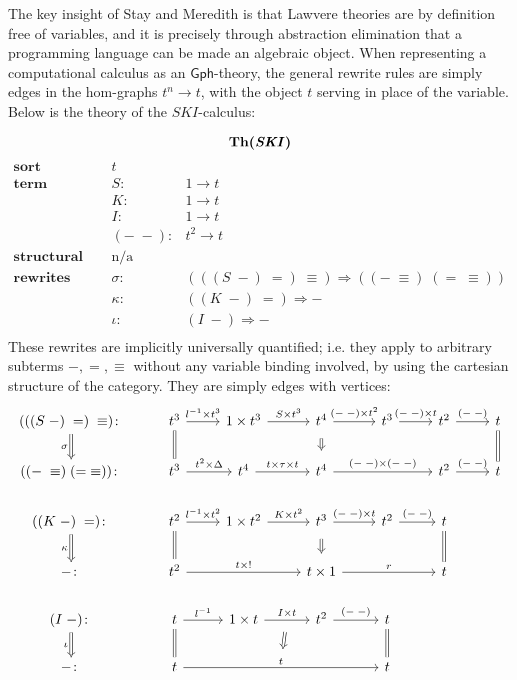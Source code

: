 \documentclass{amsart}
\theoremstyle{definition}
\newcommand{\Gph}{\mathsf{Gph}}
\newcommand{\maps}{\colon}
\begin{document}
The key insight of Stay and Meredith \cite{roswelt} is that Lawvere theories are by definition free of variables, and it is precisely through abstraction elimination that a programming language can be made an algebraic object. When representing a computational calculus as an $\Gph$-theory, the general rewrite rules are simply edges in the hom-graphs $t^n \to t$, with the object $t$ serving in place of the variable. Below is the theory of the $SKI$-calculus:

$$\textbf{Th(\textit{SKI})}$$
\[\begin{array}{rcl}
\textbf{sort} & t &\\
\textbf{term constructors} & S\maps & 1 \to t\\
& K\maps & 1 \to t\\
& I\maps & 1 \to t\\
& (-\; -)\maps &  t^2 \to t\\
\textbf{structural congruence} & \text{n/a} &\\
\textbf{rewrites} & \sigma\maps & (((S\; -)\; =)\; \equiv) \Rightarrow ((-\; \equiv)\; (=\; \equiv))\\
& \kappa\maps & ((K\; -)\; =) \Rightarrow -\\
& \iota\maps & (I\; -) \Rightarrow -\\
\end{array}\]
These rewrites are implicitly universally quantified; i.e. they apply to arbitrary subterms $-, =, \equiv$ without any variable binding involved, by using the cartesian structure of the category. They are simply edges with vertices:
\[\begin{tikzcd}
(((S\; -)\; =)\; \equiv)\maps \arrow[Rightarrow,d,swap,"\sigma"] & t^3 \arrow[d,equal] \arrow[r,"l^{-1} \times t^3"] & 1\times t^3 \arrow[r,"S \times t^3"] & t^4 \arrow[Rightarrow,d,shorten >=0.2cm,shorten <=0.2cm] \arrow[r,"(-\;-)\times t^2"] & t^3 \arrow[r,"(-\;-) \times t"] & t^2 \arrow[r,"(-\;-)"] & t\arrow[d,equal]\\
((-\; \equiv)\; (=\; \equiv))\maps & t^3 \arrow[r,"t^2 \times \Delta"] & t^4 \arrow[r,"t \times \tau \times t"]& t^4 \arrow[rr,"(-\;-) \times (-\;-)"]&& t^2 \arrow[r,"(-\;-)"]& t\\
((K\; -)\; =)\maps \arrow[Rightarrow,d,swap,"\kappa"] & t^2 \arrow[d,equal] \arrow[r,"l^{-1} \times t^2"] & 1\times t^2 \arrow[r,"K \times t^2"] & t^3 \arrow[Rightarrow,d,shorten >=0.2cm,shorten <=0.2cm] \arrow[r,"(-\;-)\times t"] & t^2 \arrow[r,"(-\;-)"] & t \arrow[d,equal]\\
-\maps & t^2 \arrow[rr,"t \times !"] && t \times 1 \arrow[rr,"r"] && t\\
(I\; -)\maps \arrow[Rightarrow,d,swap,"\iota"] & t \arrow[d,equal] \arrow[r,"l^{-1}"] & 1\times t \arrow[r,"I \times t",""name=1] & t^2 \arrow[r,"(-\;-)"] & t \arrow[d,equal]\\
-\maps & t \arrow[rrr,"t",""name=2] \arrow[Rightarrow,from=1,to=2,shorten >=0.3cm,shorten <=0.3cm] &&& t
\end{tikzcd}\]
\end{document}
